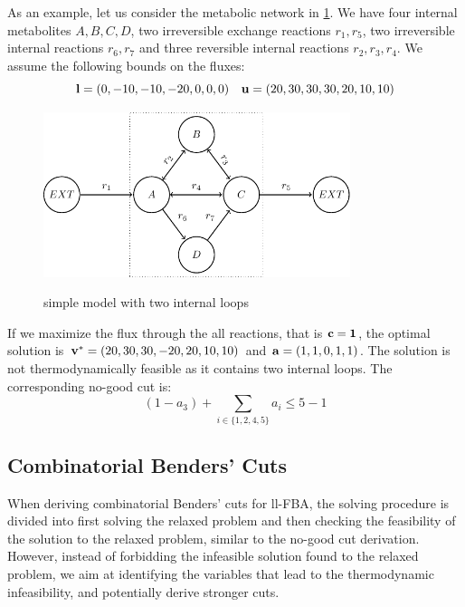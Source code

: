As an example, let us consider the metabolic network in \cref{fig:two_internal_loops}. We have four internal metabolites $A,B,C, D$, two irreversible exchange reactions $r_1, r_5$, two irreversible internal reactions $ r_6, r_7$ and three reversible internal reactions $r_2, r_3, r_4$. We assume the following bounds on the fluxes: 
\begin{equation*} \label{Eq:bounds_loop}
    \bold l = (0,-10,-10,-20,0,0,0) \quad \bold u = (20,30,30,30,20,10,10)
\end{equation*}
\begin{figure}[h!]
    \caption{simple model with two internal loops}
    \centering
    \includegraphics[width=0.8\textwidth]{Images/tikz_graphs_two_loops.pdf}
    \label{fig:two_internal_loops}
\end{figure}
If we maximize the flux through the all reactions, that is $\bold c = \bold 1$, the optimal solution is $\bold v^* = (20, 30, 30, -20, 20, 10, 10)$ and $\bold a = (1,1,0,1,1)$. The solution is not thermodynamically feasible as it contains two internal loops. The corresponding no-good cut is:
\begin{equation*}
    (1-a_3) + \sum_{i \in \{1,2,4,5\}} a_i \leq 5-1
\end{equation*}

\subsection{Combinatorial Benders' Cuts} \label{section:cb}
 When deriving combinatorial Benders' cuts for ll-FBA, the solving procedure is divided into first solving the relaxed problem and then checking the feasibility of the solution to the relaxed problem, similar to the no-good cut derivation. However, instead of forbidding the infeasible solution found to the relaxed problem, we aim at identifying the variables that lead to the thermodynamic infeasibility, and potentially derive stronger cuts.

